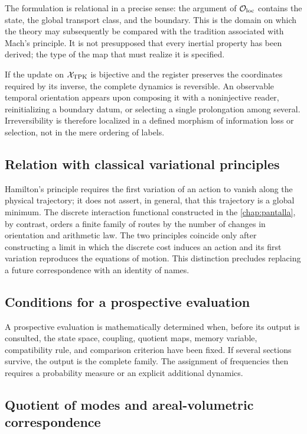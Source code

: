The formulation is relational in a precise sense: the argument of
\(\mathcal O_{\rm loc}\) contains the state, the global transport class, and
the boundary. This is the domain on which the theory may subsequently be compared
with the tradition associated with Mach's principle. It is not presupposed that
every inertial property has been derived; the type of the map that
must realize it is specified.

If the update on \(\mathcal X_{\rm TPK}\) is bijective and the register
preserves the coordinates required by its inverse, the complete dynamics is
reversible. An observable temporal orientation appears upon composing it with a
noninjective reader, reinitializing a boundary datum, or selecting a single
prolongation among several. Irreversibility is therefore localized in a
defined morphism of information loss or selection, not in the mere
ordering of labels.

\subsection{Relation with classical variational principles}

Hamilton's principle requires the first variation of an action to vanish
along the physical trajectory; it does not assert, in general, that this trajectory is a
global minimum. The discrete interaction functional constructed in the
\cref{chap:pantalla}, by contrast, orders a finite family of routes by the
number of changes in orientation and arithmetic law. The two principles
coincide only after constructing a limit in which the discrete cost
induces an action and its first variation reproduces the equations of
motion. This distinction precludes replacing a future correspondence with
an identity of names.

\subsection{Conditions for a prospective evaluation}

A prospective evaluation is mathematically determined when, before
its output is consulted, the state space, coupling,
quotient maps, memory variable, compatibility rule, and
comparison criterion have been fixed. If several sections survive, the output is the complete
family. The assignment of frequencies then requires a probability
measure or an explicit additional dynamics.


\subsection{Quotient of modes and areal-volumetric correspondence}
\label{p12-83-c16-s2:sec:cociente-modos-fav}

